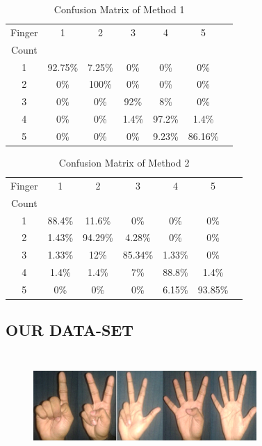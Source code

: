 \documentclass[conference]{IEEEtran}
\begin{document}
\begin{table}[h]
\caption{Confusion Matrix of Method 1}
\begin{center}
\begin{tabular}{|c|c|c|c|c|c|c|}
\hline
\multicolumn{1}{|c|}{Finger}
& \multicolumn{1}{|c|}{1}
& \multicolumn{1}{|c|}{2}
& \multicolumn{1}{|c|}{3}
& \multicolumn{1}{|c|}{4}
& \multicolumn{1}{|c|}{5}\\
Count &  &  &  &  &\\ \hline
1  &  92.75\%  &  7.25\%  & 0\%  & 0\% & 0\%\\ \hline
2  &  0\%  &  100\%  & 0\%  & 0\% & 0\%\\ \hline
3  &  0\%  &  0\%  & 92\%  & 8\% & 0\%\\ \hline
4  &  0\%  &  0\%  & 1.4\%  & 97.2\% & 1.4\%\\ \hline
5  &  0\%  &  0\%  & 0\%  & 9.23\% & 86.16\%\\ \hline
\end{tabular}
\label{table-tab2}
\end{center}
\end{table}

\begin{table}[h]
\caption{Confusion Matrix of Method 2}
\begin{center}
\begin{tabular}{|c|c|c|c|c|c|c|}
\hline
\multicolumn{1}{|c|}{Finger}
& \multicolumn{1}{|c|}{1}
& \multicolumn{1}{|c|}{2}
& \multicolumn{1}{|c|}{3}
& \multicolumn{1}{|c|}{4}
& \multicolumn{1}{|c|}{5}\\
Count &  &  &  &  &\\ \hline
1  &  88.4\%  &  11.6\%  & 0\%  & 0\% & 0\%\\ \hline
2  &  1.43\%  &  94.29\%  & 4.28\%  & 0\% & 0\%\\ \hline
3  &  1.33\%  &  12\%  & 85.34\%  & 1.33\% & 0\%\\ \hline
4  &  1.4\%  &  1.4\%  & 7\%  & 88.8\% & 1.4\%\\ \hline
5  &  0\%  &  0\%  & 0\%  & 6.15\% & 93.85\%\\ \hline
\end{tabular}
\label{table-tab2}
\end{center}
\end{table}

\subsection{OUR DATA-SET}
\begin{figure}[h!]
	\centering
	\includegraphics[width = 8.5cm, height = 4cm]{ourdataset}
\end{figure}
\end{document}
